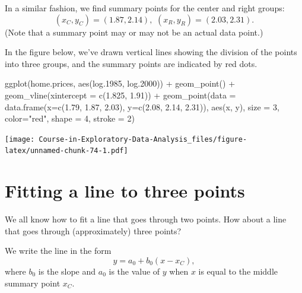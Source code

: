 \documentclass[
]{book}
\newenvironment{Shaded}{\begin{snugshade}}{\end{snugshade}}
\newcommand{\AttributeTok}[1]{\textcolor[rgb]{0.77,0.63,0.00}{#1}}
\newcommand{\DecValTok}[1]{\textcolor[rgb]{0.00,0.00,0.81}{#1}}
\newcommand{\FloatTok}[1]{\textcolor[rgb]{0.00,0.00,0.81}{#1}}
\newcommand{\FunctionTok}[1]{\textcolor[rgb]{0.00,0.00,0.00}{#1}}
\newcommand{\NormalTok}[1]{#1}
\newcommand{\SpecialCharTok}[1]{\textcolor[rgb]{0.00,0.00,0.00}{#1}}
\newcommand{\StringTok}[1]{\textcolor[rgb]{0.31,0.60,0.02}{#1}}
\begin{document}
In a similar fashion, we find summary points for the center and right groups:
\[
(x_C, y_C) =  (1.87, 2.14), \, \,    (x_R, y_R) = (2.03, 2.31).
\]
(Note that a summary point may or may not be an actual data point.)

In the figure below, we've drawn vertical lines showing the division of the points into three groups, and the summary points are indicated by red dots.

\begin{Shaded}
\begin{Highlighting}[]
\FunctionTok{ggplot}\NormalTok{(home.prices, }\FunctionTok{aes}\NormalTok{(log}\FloatTok{.1985}\NormalTok{, log}\FloatTok{.2000}\NormalTok{)) }\SpecialCharTok{+}
  \FunctionTok{geom\_point}\NormalTok{() }\SpecialCharTok{+}
  \FunctionTok{geom\_vline}\NormalTok{(}\AttributeTok{xintercept =} \FunctionTok{c}\NormalTok{(}\FloatTok{1.825}\NormalTok{, }\FloatTok{1.91}\NormalTok{)) }\SpecialCharTok{+}
  \FunctionTok{geom\_point}\NormalTok{(}\AttributeTok{data =} \FunctionTok{data.frame}\NormalTok{(}\AttributeTok{x=}\FunctionTok{c}\NormalTok{(}\FloatTok{1.79}\NormalTok{, }\FloatTok{1.87}\NormalTok{, }\FloatTok{2.03}\NormalTok{), }
                       \AttributeTok{y=}\FunctionTok{c}\NormalTok{(}\FloatTok{2.08}\NormalTok{, }\FloatTok{2.14}\NormalTok{, }\FloatTok{2.31}\NormalTok{)),}
             \FunctionTok{aes}\NormalTok{(x, y), }\AttributeTok{size =} \DecValTok{3}\NormalTok{, }\AttributeTok{color=}\StringTok{"red"}\NormalTok{,}
             \AttributeTok{shape =} \DecValTok{4}\NormalTok{, }\AttributeTok{stroke =} \DecValTok{2}\NormalTok{)}
\end{Highlighting}
\end{Shaded}

\texttt{[image: Course-in-Exploratory-Data-Analysis\_files/figure-latex/unnamed-chunk-74-1.pdf]}

\hypertarget{fitting-a-line-to-three-points}{%
\section{Fitting a line to three points}\label{fitting-a-line-to-three-points}}

We all know how to fit a line that goes through two points. How about a line that goes through (approximately) three points?

We write the line in the form
\[
  y = a_0 + b_0 (x - x_C) ,
\]
where \(b_0\) is the slope and \(a_0\) is the value of \(y\) when \(x\) is equal to the middle summary point \(x_C\).
\end{document}
